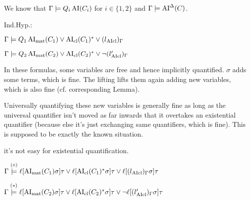 \documentclass[,%
	paper=a4,%
	DIV10, %
	twoside=false,%
	liststotoc,
	bibtotoc,
	draft=false,%
	numbers=noendperiod
]{scrartcl}
\begin{document}
We know that $\Gamma \models Q_i \operatorname{AI}(C_i)$ for $i\in\{1,2\}$ and $\Gamma \models \operatorname{AI}^\Delta(C)$.

\newcommand{\clauseOnePrime}{\AIclause(C_1)^*}
\newcommand{\clauseTwoPrime}{\AIclause(C_2)^*}

Ind.Hyp.:

$\Gamma \entails Q_1 \AImatrix(C_1) \lor \clauseOnePrime \lor {(l{\fromclause})_\Gamma}$

$\Gamma \entails Q_2 \AImatrix(C_2) \lor \clauseTwoPrime \lor {\lnot (l{\fromclause'})_\Gamma}$

In these formulas, some variables are free and hence implicitly quantified. 
$\sigma$ adds some terms, which is fine. The lifting lifts them again adding new variables, which is also fine (cf.{} corresponding Lemma).

Universally quantifying these new variables is generally fine as long as the universal quantifier isn't moved as far inwards that it overtakes an existential quantifier (because else it's just exchanging same quantifiers, which is fine).
This is supposed to be exactly the known situation. 

it's not easy for existential quantification.





$\Gamma \stackrel{\markA}\entails \lifboth{\AImatrix(C_1)\sigma}\tau \lor \lifboth{\clauseOnePrime\sigma}\tau \lor \lifboth{(l{\fromclause})_\Gamma\sigma}\tau$

$\Gamma \stackrel{\markB}\entails \lifboth{\AImatrix(C_2)\sigma}\tau \lor \lifboth{\clauseTwoPrime\sigma}\tau \lor \lnot \lifboth{(l{\fromclause'})_\Gamma\sigma}\tau$
\end{document}
